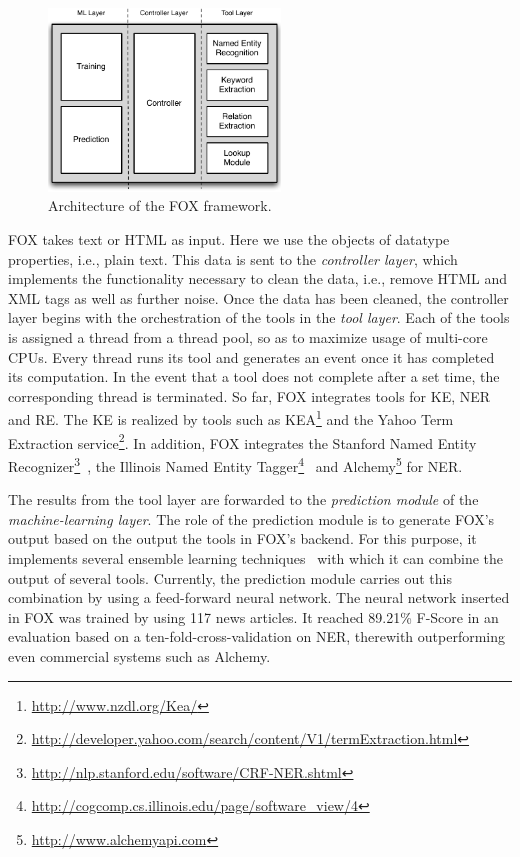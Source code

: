 \documentclass[a4paper,twoside,bibtotoc,abstracton,12pt,BCOR=15mm]{article}
\begin{document}
\begin{figure}[htb]
\centering
\includegraphics[width=0.55\textwidth]{images/FOX_Architecture}
\caption{Architecture of the FOX framework.}%
\label{fig:foxArchitecture}
\end{figure}

FOX takes text or HTML as input.
Here we use the objects of datatype properties, i.e., plain text.
This data is sent to the \emph{controller layer}, which implements the functionality necessary to clean the data, i.e., remove HTML and XML tags as well as further noise.
Once the data has been cleaned, the controller layer begins with the orchestration of the tools in the \emph{tool layer}.
Each of the tools is assigned a thread from a thread pool, so as to maximize usage of multi-core CPUs.
Every thread runs its tool and generates an event once it has completed its computation.
In the event that a tool does not complete after a set time, the corresponding thread is terminated. 
So far, FOX integrates tools for KE, NER and RE. The KE is realized by tools such as KEA\footnote{\url{http://www.nzdl.org/Kea/}} and the Yahoo Term Extraction service\footnote{\url{http://developer.yahoo.com/search/content/V1/termExtraction.html}}.
In addition, FOX integrates the Stanford Named Entity Recognizer\footnote{\url{http://nlp.stanford.edu/software/CRF-NER.shtml}}~\cite{FIN+05}, the Illinois Named Entity Tagger\footnote{\url{http://cogcomp.cs.illinois.edu/page/software_view/4}}~\cite{RARO09} and Alchemy\footnote{\url{http://www.alchemyapi.com}} for NER. 

The results from the tool layer are forwarded to the \emph{prediction module} of the \emph{machine-learning layer}.
The role of the prediction module is to generate FOX's output based on the output the tools in FOX's backend.
For this purpose, it implements several ensemble learning techniques~\cite{DIE00} with which it can combine the output of several tools. 
Currently, the prediction module carries out this combination by using a feed-forward neural network. 
The neural network inserted in FOX was trained by using 117 news articles. 
It reached 89.21\% F-Score in an evaluation based on a ten-fold-cross-validation on NER, therewith outperforming even commercial systems such as Alchemy.
\end{document}
